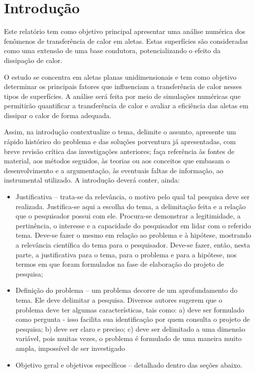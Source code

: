 \chapter{Introdução}\label{cap:introducao}

Este relatório tem como objetivo principal apresentar uma análise numérica dos fenômenos de transferência de calor em aletas. Estas superfícies são consideradas como uma extensão de uma base condutora, potencializando o efeito da dissipação de calor.

O estudo se concentra em aletas planas unidimensionais e tem como objetivo determinar os principais fatores que influenciam a transferência de calor nesses tipos de superfícies. A análise será feita por meio de simulações numéricas que permitirão quantificar a transferência de calor e avaliar a eficiência das aletas em dissipar o calor de forma adequada.

Assim, na introdução contextualize o tema, delimite o assunto, apresente um rápido histórico do problema e das soluções porventura já apresentadas, com breve revisão crítica das investigações anteriores; faça referência às fontes de material, aos métodos seguidos, às teorias ou aos conceitos que embasam o desenvolvimento e a argumentação, às eventuais faltas de informação, ao instrumental utilizado. A introdução deverá conter, ainda:

\begin{itemize}
   \item Justificativa -- trata-se da relevância, o motivo pelo qual tal pesquisa deve ser realizada. Justifica-se aqui a escolha do tema, a delimitação feita e a relação que o pesquisador possui com ele. Procura-se demonstrar a legitimidade, a pertinência, o interesse e a capacidade do pesquisador em lidar com o referido tema. Deve-se fazer o mesmo em relação ao problema e à hipótese, mostrando a relevância científica do tema para o pesquisador. Deve-se fazer, então, nesta parte, a justificativa para o tema, para o problema e para a hipótese, nos termos em que foram formulados na fase de elaboração do projeto de pesquisa;
   
   \item Definição do problema -- um problema decorre de um aprofundamento do tema. Ele deve delimitar a pesquisa. Diversos autores sugerem que o problema deve ter algumas características, tais como: a) deve ser formulado como pergunta - isso facilita sua identificação por quem consulta o projeto de pesquisa; b) deve ser claro e preciso; c) deve ser delimitado a uma dimensão variável, pois muitas vezes, o problema é formulado de uma maneira muito ampla, impossível de ser investigado 
   
   \item Objetivo geral e objetivos específicos -- detalhado dentro das seções abaixo.
\end{itemize}

